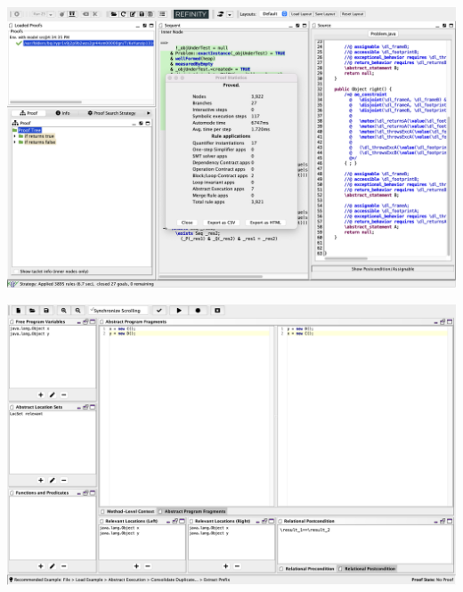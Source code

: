 \begin{frame}\vspace*{-5mm}
  \begin{center}
    \includegraphics[scale=.25]{screenshots/SlideAbstractProved}
  \end{center}    
\end{frame}

\begin{frame}\vspace*{-5mm}
  \begin{center}
    \includegraphics[scale=.25]{screenshots/Slide}
  \end{center}    
\end{frame}

